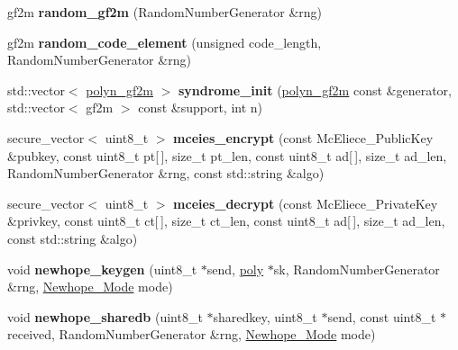 \begin{DoxyCompactItemize}
gf2m {\bfseries random\+\_\+gf2m} (Random\+Number\+Generator \&rng)
\item 
\mbox{\label{namespace_botan_adb7b7c44821bc546a8d4ae730966c89e}} 
gf2m {\bfseries random\+\_\+code\+\_\+element} (unsigned code\+\_\+length, Random\+Number\+Generator \&rng)
\item 
\mbox{\label{namespace_botan_a1b38a4a205cd087803b9a9b3c109d304}} 
std\+::vector$<$ \mbox{\hyperlink{class_botan_1_1polyn__gf2m}{polyn\+\_\+gf2m}} $>$ {\bfseries syndrome\+\_\+init} (\mbox{\hyperlink{class_botan_1_1polyn__gf2m}{polyn\+\_\+gf2m}} const \&generator, std\+::vector$<$ gf2m $>$ const \&support, int n)
\item 
\mbox{\label{namespace_botan_a7cd43fb69186e28b8d97fecaad70c4ef}} 
secure\+\_\+vector$<$ uint8\+\_\+t $>$ {\bfseries mceies\+\_\+encrypt} (const Mc\+Eliece\+\_\+\+Public\+Key \&pubkey, const uint8\+\_\+t pt\mbox{[}$\,$\mbox{]}, size\+\_\+t pt\+\_\+len, const uint8\+\_\+t ad\mbox{[}$\,$\mbox{]}, size\+\_\+t ad\+\_\+len, Random\+Number\+Generator \&rng, const std\+::string \&algo)
\item 
\mbox{\label{namespace_botan_a6c9e5d5d1c169cf94500786f338d1f85}} 
secure\+\_\+vector$<$ uint8\+\_\+t $>$ {\bfseries mceies\+\_\+decrypt} (const Mc\+Eliece\+\_\+\+Private\+Key \&privkey, const uint8\+\_\+t ct\mbox{[}$\,$\mbox{]}, size\+\_\+t ct\+\_\+len, const uint8\+\_\+t ad\mbox{[}$\,$\mbox{]}, size\+\_\+t ad\+\_\+len, const std\+::string \&algo)
\item 
\mbox{\label{namespace_botan_ab5e5c383ece5e6d467494a75ff0d5d66}} 
void {\bfseries newhope\+\_\+keygen} (uint8\+\_\+t $\ast$send, \mbox{\hyperlink{class_botan_1_1newhope__poly}{poly}} $\ast$sk, Random\+Number\+Generator \&rng, \mbox{\hyperlink{namespace_botan_a42a70d7cfb95e4f7773d3b52dc98ad61}{Newhope\+\_\+\+Mode}} mode)
\item 
\mbox{\label{namespace_botan_aaa9324c0b322f6247eab2d9ecc727ce6}} 
void {\bfseries newhope\+\_\+sharedb} (uint8\+\_\+t $\ast$sharedkey, uint8\+\_\+t $\ast$send, const uint8\+\_\+t $\ast$received, Random\+Number\+Generator \&rng, \mbox{\hyperlink{namespace_botan_a42a70d7cfb95e4f7773d3b52dc98ad61}{Newhope\+\_\+\+Mode}} mode)
\item 

\end{DoxyCompactItemize}

